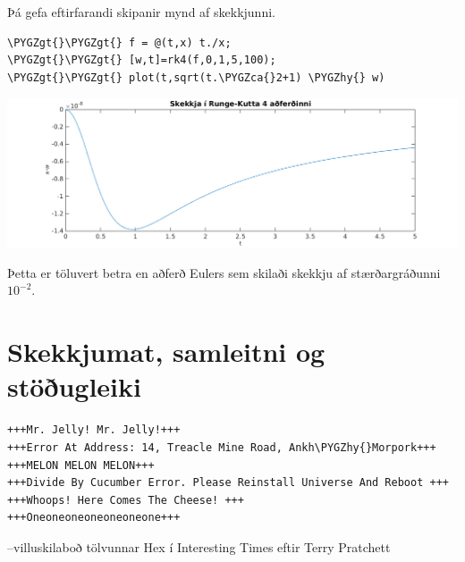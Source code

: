 \documentclass[letterpaper,10pt,icelandic]{sphinxmanual}
\def\PYGZca{\char`\^}
\def\PYGZgt{\char`\>}
\def\PYGZhy{\char`\-}
\begin{document}
Þá gefa eftirfarandi skipanir mynd af skekkjunni.

\begin{Verbatim}[commandchars=\\\{\}]
\PYGZgt{}\PYGZgt{} f = @(t,x) t./x;
\PYGZgt{}\PYGZgt{} [w,t]=rk4(f,0,1,5,100);
\PYGZgt{}\PYGZgt{} plot(t,sqrt(t.\PYGZca{}2+1) \PYGZhy{} w)
\end{Verbatim}

\includegraphics{7rk4.png}

Þetta er töluvert betra en aðferð Eulers sem skilaði skekkju af stærðargráðunni
\(10^{-2}\).


\section{Skekkjumat, samleitni og stöðugleiki}
\label{kafli06:skekkjumat-samleitni-og-stougleiki}
\begin{Verbatim}[commandchars=\\\{\}]
+++Mr. Jelly! Mr. Jelly!+++
+++Error At Address: 14, Treacle Mine Road, Ankh\PYGZhy{}Morpork+++
+++MELON MELON MELON+++
+++Divide By Cucumber Error. Please Reinstall Universe And Reboot +++
+++Whoops! Here Comes The Cheese! +++
+++Oneoneoneoneoneoneone+++
\end{Verbatim}

--villuskilaboð tölvunnar Hex í Interesting Times eftir Terry Pratchett

\end{document}
